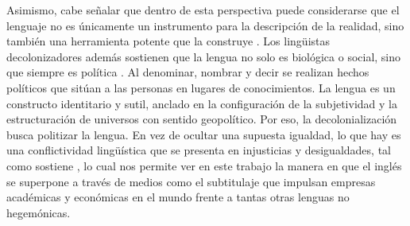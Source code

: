 \documentclass[spanish]{textolivre}
\begin{document}
Asimismo, cabe señalar que dentro de esta perspectiva puede considerarse que el lenguaje no es únicamente un instrumento para la descripción de la realidad, sino también una herramienta potente que la construye \textcite{foucault_palabras_2001}. Los lingüistas decolonizadores además sostienen que la lengua no solo es biológica o social, sino que siempre es política \cite{baum2019decir, garces__colonialidad_2009}. Al denominar, nombrar y decir se realizan hechos políticos que sitúan a las personas en lugares de conocimientos. La lengua es un constructo identitario y sutil, anclado en la configuración de la subjetividad y la estructuración de universos con sentido geopolítico. Por eso, la decolonialización busca politizar la lengua. En vez de ocultar una supuesta igualdad, lo que hay es una conflictividad lingüística que se presenta en injusticias y desigualdades, tal como sostiene \textcite{baum2019decir}, lo cual nos permite ver en este trabajo la manera en que el inglés se superpone a través de medios como el subtitulaje que impulsan empresas académicas y económicas en el mundo frente a tantas otras lenguas no hegemónicas.
\end{document}
